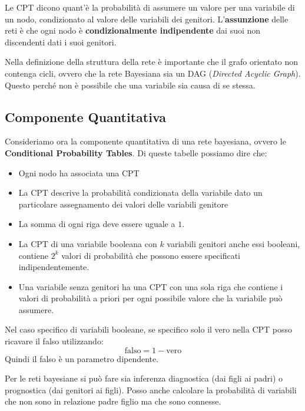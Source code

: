 Le CPT dicono quant'è la probabilità di assumere un valore per una variabile di
un nodo, condizionato al valore delle variabili dei genitori. L'\textbf{assunzione} delle
reti è che ogni nodo è \textbf{condizionalmente indipendente} dai suoi non discendenti
dati i suoi genitori.

Nella definizione della struttura della rete è importante che il grafo orientato
non contenga cicli, ovvero che la rete Bayesiana sia un DAG (\textit{Directed Acyclic
    Graph}). Questo perché non è possibile che una variabile sia causa di se stessa.

\subsection{Componente Quantitativa}
Consideriamo ora la componente quantitativa di una rete bayesiana, ovvero le \textbf{Conditional Probability Tables}.
Di queste tabelle possiamo dire che:
\begin{itemize}
    \item Ogni nodo ha associata una CPT
    \item La CPT descrive la probabilità condizionata della variabile dato un particolare
          assegnamento dei valori delle variabili genitore
    \item La somma di ogni riga deve essere uguale a $1$.
    \item La CPT di una variabile booleana con $k$ variabili genitori anche essi booleani, contiene
          $2^k$ valori di probabilità che possono essere specificati indipendentemente.
    \item Una variabile senza genitori ha una CPT con una sola riga che contiene i valori
          di probabilità a priori per ogni possibile valore che la variabile può assumere.
\end{itemize}

\begin{nota}
    Nel caso specifico di variabili booleane, se specifico solo il vero nella
    CPT posso ricavare il falso utilizzando:
    \begin{equation*}
        \text{falso} = 1 - \text{vero}
    \end{equation*}
    Quindi il falso è un parametro dipendente.
\end{nota}

Per le reti bayesiane si può fare sia inferenza diagnostica (dai figli ai padri)
o prognostica (dai genitori ai figli). Posso anche calcolare la probabilità di
variabili che non sono in relazione padre figlio ma che sono connesse.

